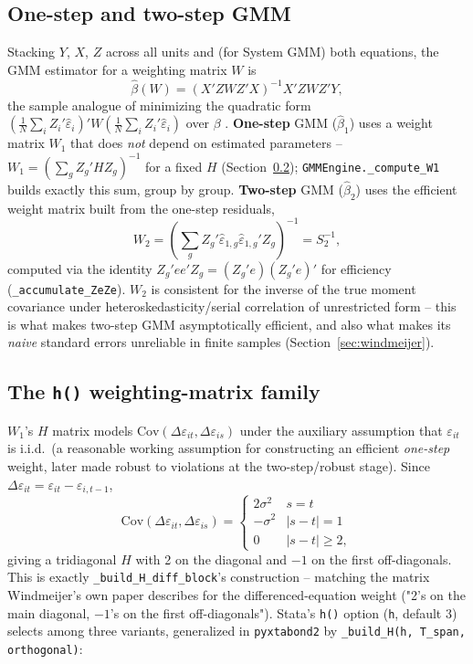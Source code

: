 \documentclass[11pt,a4paper]{article}
\newcommand{\pkg}{\texttt{pyxtabond2}}
\begin{document}
\subsection{One-step and two-step GMM}
\label{sec:onetwostep}

Stacking $Y$, $X$, $Z$ across all units and (for System GMM) both equations,
the GMM estimator for a weighting matrix $W$ is
\begin{equation}
  \hat\beta(W) = \left(X'ZWZ'X\right)^{-1}X'ZWZ'Y, \label{eq:gmmest}
\end{equation}
the sample analogue of minimizing the quadratic form
$\left(\frac1N\sum_i Z_i'\hat\varepsilon_i\right)'W\left(\frac1N\sum_i
Z_i'\hat\varepsilon_i\right)$ over $\beta$ \citep{Hansen1982}. \textbf{One-step}
GMM ($\hat\beta_1$) uses a weight matrix $W_1$ that does \emph{not} depend on
estimated parameters -- $W_1 = \left(\sum_g Z_g'HZ_g\right)^{-1}$ for a fixed
$H$ (Section~\ref{sec:hmatrix}); \texttt{GMMEngine.\_compute\_W1} builds
exactly this sum, group by group. \textbf{Two-step} GMM ($\hat\beta_2$) uses
the efficient weight matrix built from the one-step residuals,
\begin{equation}
  W_2 = \left(\sum_g Z_g'\hat\varepsilon_{1,g}\hat\varepsilon_{1,g}'Z_g\right)^{-1}
      = S_2^{-1}, \label{eq:w2}
\end{equation}
computed via the identity $Z_g'ee'Z_g=(Z_g'e)(Z_g'e)'$ for efficiency
(\texttt{\_accumulate\_ZeZe}). $W_2$ is consistent for the inverse of the
true moment covariance under heteroskedasticity/serial correlation of
unrestricted form -- this is what makes two-step GMM asymptotically
efficient, and also what makes its \emph{naive} standard errors unreliable
in finite samples (Section~\ref{sec:windmeijer}).

\subsection{The \texttt{h()} weighting-matrix family}
\label{sec:hmatrix}

$W_1$'s $H$ matrix models $\mathrm{Cov}(\Delta\varepsilon_{it},\Delta\varepsilon_{is})$
under the auxiliary assumption that $\varepsilon_{it}$ is i.i.d.\ (a
reasonable working assumption for constructing an efficient \emph{one-step}
weight, later made robust to violations at the two-step/robust stage).
Since $\Delta\varepsilon_{it}=\varepsilon_{it}-\varepsilon_{i,t-1}$,
\[
  \mathrm{Cov}(\Delta\varepsilon_{it},\Delta\varepsilon_{is}) =
  \begin{cases} 2\sigma^2 & s=t\\ -\sigma^2 & |s-t|=1\\ 0 & |s-t|\ge2,\end{cases}
\]
giving a tridiagonal $H$ with 2 on the diagonal and $-1$ on the first
off-diagonals. This is exactly \texttt{\_build\_H\_diff\_block}'s
construction -- matching the matrix Windmeijer's own paper describes for the
differenced-equation weight ("2's
on the main diagonal, $-1$'s on the first off-diagonals"). Stata's
\texttt{h()} option (\texttt{h}, default 3) selects among three variants,
generalized in \pkg{} by \texttt{\_build\_H(h, T\_span, orthogonal)}:
\end{document}
